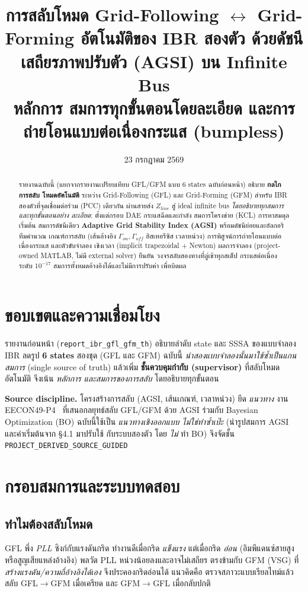 \documentclass[12pt,a4paper]{article}
\title{\textbf{การสลับโหมด Grid-Following $\leftrightarrow$ Grid-Forming อัตโนมัติของ IBR สองตัว
ด้วยดัชนีเสถียรภาพปรับตัว (AGSI) บน Infinite Bus}\\
\large หลักการ สมการทุกขั้นตอนโดยละเอียด และการถ่ายโอนแบบต่อเนื่องกระแส (bumpless)}
\date{23 กรกฎาคม 2569}
\begin{document}
\maketitle

\begin{abstract}
รายงานฉบับนี้ (แยกจากรายงานเปรียบเทียบ GFL/GFM แบบ 6 states ฉบับก่อนหน้า) อธิบาย \textbf{กลไกการสลับ
โหมดอัตโนมัติ} ระหว่าง Grid-Following (GFL) และ Grid-Forming (GFM) สำหรับ IBR สองตัวที่จุดเชื่อมต่อร่วม
(PCC) เดียวกัน ผ่านสายส่ง $Z_{line}$ สู่ ideal infinite bus \emph{โดยอธิบายทุกสมการและทุกขั้นตอนอย่าง
ละเอียด}: ตั้งแต่กรอบ DAE กระแสฉีดและกำลัง สมการโครงข่าย (KCL) การหาสมดุลเริ่มต้น สมการดัชนีเดียว
\textbf{Adaptive Grid Stability Index (AGSI)} พร้อมดัชนีย่อยและอัลกอริทึมคำนวณ เกณฑ์การสลับ (เส้นอ้างอิง
$\Gamma_{on},\Gamma_{off}$ ฮิสเทอรีซิส เวลาหน่วง) การพิสูจน์การถ่ายโอนแบบต่อเนื่องกระแส และตัวขับจำลอง
เชิงเวลา (implicit trapezoidal + Newton) ผลการจำลอง (project-owned MATLAB, ไม่มี external solver) ยืนยัน
วงจรสลับสองทางที่ลู่เข้าทุกสเต็ป กระแสต่อเนื่องระดับ $10^{-17}$ สมการทั้งหมดอ้างอิงได้และไม่มีการปรับค่า
เพื่อบิดผล
\end{abstract}
\newpage
\tableofcontents
\newpage

\section{ขอบเขตและความเชื่อมโยง}
รายงานก่อนหน้า (\texttt{report\_ibr\_gfl\_gfm\_th}) อธิบายลำดับ state และ SSSA ของแบบจำลอง IBR ลดรูป
\textbf{6 states} สองชุด (GFL และ GFM) ฉบับนี้ \emph{นำสองแบบจำลองนั้นมาใช้ซ้ำเป็นแกนสมการ} (single
source of truth) แล้วเพิ่ม \textbf{ชั้นควบคุมกำกับ (supervisor)} ที่สลับโหมดอัตโนมัติ จึงเน้น \emph{หลักการ
และสมการของการสลับ} โดยอธิบายทุกขั้นตอน

\textbf{Source discipline.} โครงสร้างการสลับ (AGSI, เส้นเกณฑ์, เวลาหน่วง) ยึด \emph{แนวทาง} งาน
EECON49-P4~\cite{eecon49th} ที่เสนอกลยุทธ์สลับ GFL/GFM ด้วย AGSI ร่วมกับ Bayesian Optimization (BO)
ฉบับนี้ใช้เป็น \emph{แนวทางเชิงออกแบบ ไม่ใช่ทำซ้ำเป๊ะ} (นำรูปสมการ AGSI และค่าเริ่มต้นจาก \S4.1 มาปรับใช้
กับระบบสองตัว โดย \emph{ไม่} ทำ BO) จึงจัดชั้น \texttt{PROJECT\_DERIVED\_SOURCE\_GUIDED}

\section{กรอบสมการและระบบทดสอบ}
\subsection{ทำไมต้องสลับโหมด}
GFL พึ่ง \emph{PLL} ซิงก์กับแรงดันกริด ทำงานดีเมื่อกริด \emph{แข็งแรง} แต่เมื่อกริด \emph{อ่อน}
(อิมพีแดนซ์สายสูง หรือสูญเสียแหล่งอ้างอิง) พลวัต PLL หน่วงน้อยลงและอาจไม่เสถียร ตรงข้ามกับ GFM (VSG) ที่
\emph{สร้างแรงดัน/ความถี่อ้างอิงได้เอง} จึงประคองกริดอ่อนได้ แนวคิดคือ ตรวจสภาวะแบบเรียลไทม์แล้วสลับ
GFL$\to$GFM เมื่อเครียด และ GFM$\to$GFL เมื่อกลับปกติ
\end{document}
